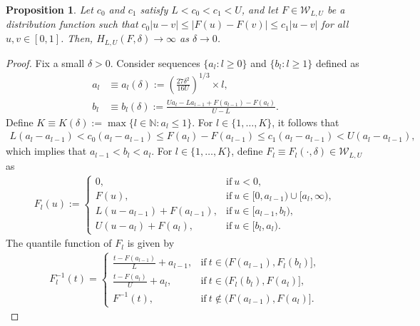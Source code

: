 \documentclass[10pt,a4paper]{amsart}
\newtheorem{proposition}{Proposition}
\newcommand{\W}{\mathcal{W}}
\begin{document}
\begin{proposition} \label{thm:second}
    Let \(c_0\) and \(c_1\) satisfy \(L<c_0<c_1<U\), and let
\(F\in\W_{L,U}\) be a distribution function such that $c_0|u-v|\le |F(u)-F(v)|\le c_1|u-v|$ for all $u,v\in[0,1]$. Then, $H_{L, U}(F,\delta) \to \infty$ as $\delta \to 0$.
\end{proposition}

\begin{proof}
    Fix a small $\delta > 0$. Consider sequences $\{a_l: l \ge 0\}$ and $\{b_l: l \ge 1\}$ defined as
    \begin{align*}
        a_l &\equiv a_l(\delta):= \left( \frac{27\delta^2}{16U} \right)^{1/3} \times l, \\
        b_l &\equiv b_l(\delta):= \frac{U a_{l} - L a_{l-1} + F(a_{l-1}) - F(a_{l})}{U-L}.
    \end{align*}
    Define $K \equiv K(\delta):= \max \{l \in \mathbb{N} : a_l \leq 1 \}$. For $l \in \{1, \ldots, K\}$, it follows that
    \begin{align*}
        L (a_{l} - a_{l-1}) < c_0 (a_{l} - a_{l-1}) \le F(a_{l}) - F(a_{l-1}) \le c_1 (a_{l} - a_{l-1}) < U (a_{l} - a_{l-1}),
    \end{align*}
    which implies that $a_{l-1} < b_l < a_l$. For $l \in \{1, \ldots, K\}$, define $F_l \equiv F_l(\cdot,\delta)\in\mathcal{W}_{L,U}$ as
    \begin{align*}
        F_l (u) :=
        \begin{cases}
            0, & \text{if}~u < 0, \\
            F(u), & \text{if}~u\in[0,a_{l-1})\cup[a_l, \infty),\\
            L(u-a_{l-1}) + F(a_{l-1}), & \text{if}~u \in [a_{l-1}, b_l), \\
            U(u-a_{l}) + F(a_{l}), & \text{if}~u \in [b_l, a_l). %
        \end{cases}
    \end{align*}
    The quantile function of $F_l$ is given by
    \begin{align*}
        F_l^{-1} (t) =
        \begin{cases}
            \frac{t-F(a_{l-1})}{L} + a_{l-1}, & \text{if}~t \in (F(a_{l-1}), F_l(b_l)], \\
            \frac{t-F(a_{l})}{U} + a_{l}, & \text{if}~t \in (F_l(b_{l}), F(a_l)], \\
            F^{-1}(t), & \text{if}~t \notin (F(a_{l-1}), F(a_l)].
        \end{cases}

\end{align*}
\end{proof}
\end{document}

